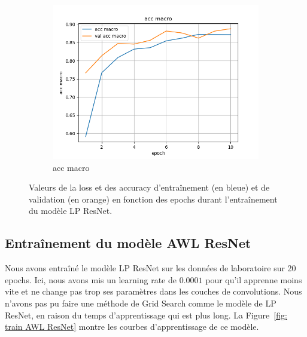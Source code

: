 \begin{figure}[ht]
\begin{subfigure}{0.32\textwidth}
        \includegraphics[width=\linewidth]{../logs/resnet_img256_0/acc macro.png}
        \caption{acc macro}
    \end{subfigure}
    \caption{Valeurs de la loss et des accuracy d'entraînement (en bleue) et de validation (en orange) en fonction des epochs durant l'entraînement du modèle LP ResNet.}
    \label{fig: train LP ResNet}
\end{figure}

\subsection{Entraînement du modèle AWL ResNet}
Nous avons entraîné le modèle LP ResNet sur les données de laboratoire sur 20 epochs. Ici, nous avons mis un learning rate de $0.0001$ pour qu'il apprenne moins vite et ne change pas trop ses paramètres dans les couches de convolutions. Nous n'avons pas pu faire une méthode de Grid Search comme le modèle de LP ResNet, en raison du temps d'apprentissage qui est plus long. La Figure~\ref{fig: train AWL ResNet} montre les courbes d'apprentissage de ce modèle.


